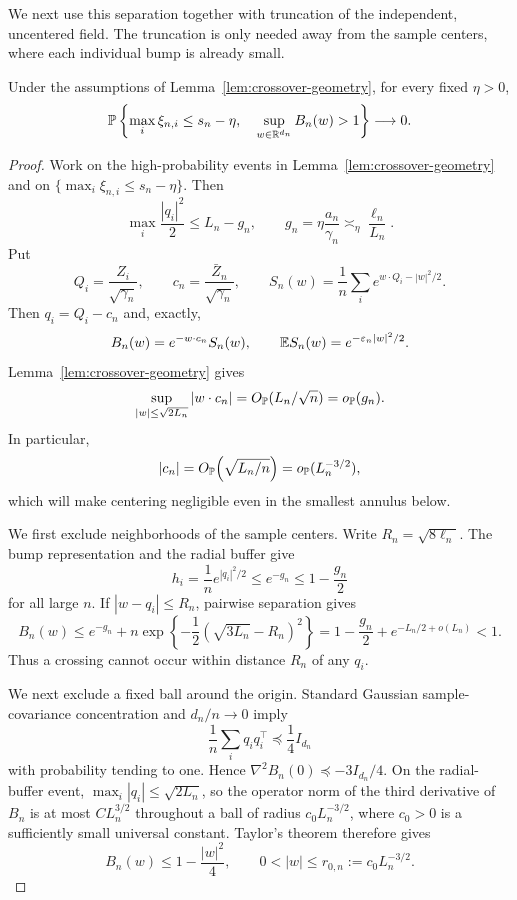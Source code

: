 We next use this separation together with truncation of the independent,
uncentered field.  The truncation is only needed away from the sample
centers, where each individual bump is already small.

\begin{proposition}
\label{prop:crossover-exclusion}
Under the assumptions of Lemma~\ref{lem:crossover-geometry}, for
every fixed \(\eta>0\),
\[
 \mathbb P\left\{
  \max_i\xi_{n,i}\le s_n-\eta,\quad
  \sup_{w\in\mathbb R^{d_n}}B_n(w)>1
 \right\}\longrightarrow0.
\]
\end{proposition}

\begin{proof}
Work on the high-probability events in Lemma~\ref{lem:crossover-geometry}
and on
\(\{\max_i\xi_{n,i}\le s_n-\eta\}\).  Then
\[
 \max_i\frac{|q_i|^2}{2}\le L_n-g_n,
 \qquad
 g_n=\eta\frac{a_n}{\gamma_n}\asymp_\eta\frac{\ell_n}{L_n}.
\]
 Put
 \[
  Q_i=\frac{Z_i}{\sqrt{\gamma_n}},
  \qquad c_n=\frac{\bar Z_n}{\sqrt{\gamma_n}},
  \qquad
  S_n(w)=\frac1n\sum_i e^{w\cdot Q_i-|w|^2/2}.
 \]
 Then \(q_i=Q_i-c_n\) and, exactly,
 \begin{equation}
 \label{eq:crossover-centering-identity}
  B_n(w)=e^{-w\cdot c_n}S_n(w),
  \qquad
  \mathbb E S_n(w)=e^{-\varepsilon_n|w|^2/2}.
 \end{equation}
 Lemma~\ref{lem:crossover-geometry} gives
 \begin{equation}
 \label{eq:crossover-centering-small}
  \sup_{|w|\le\sqrt{2L_n}}|w\cdot c_n|
 =O_{\mathbb P}(L_n/\sqrt n)=o_{\mathbb P}(g_n).
\end{equation}
In particular,
\[
 |c_n|=O_{\mathbb P}\!\left(\sqrt{L_n/n}\right)
 =o_{\mathbb P}(L_n^{-3/2}),
\]
which will make centering negligible even in the smallest annulus below.

 We first exclude neighborhoods of the sample centers.  Write
 \(R_n=\sqrt{8\ell_n}\).  The bump representation and the radial buffer
 give
 \[
  h_i=\frac1n e^{|q_i|^2/2}\le e^{-g_n}\le1-\frac{g_n}{2}
 \]
 for all large \(n\).  If \(|w-q_i|\le R_n\), pairwise separation gives
 \[
  B_n(w)
  \le e^{-g_n}
  +n\exp\left\{-\frac12(\sqrt{3L_n}-R_n)^2\right\}
  =1-\frac{g_n}{2}+e^{-L_n/2+o(L_n)}<1.
 \]
 Thus a crossing cannot occur within distance \(R_n\) of any \(q_i\).

We next exclude a fixed ball around the origin.  Standard Gaussian
sample-covariance concentration and \(d_n/n\to0\) imply
\[
 \frac1n\sum_iq_iq_i^\top\preceq\frac14I_{d_n}
\]
with probability tending to one.  Hence
\(\nabla^2B_n(0)\preceq-3I_{d_n}/4\).  On the radial-buffer event,
\(\max_i|q_i|\le\sqrt{2L_n}\), so the operator norm of the third derivative
of \(B_n\) is at most \(CL_n^{3/2}\) throughout a ball of radius
\(c_0L_n^{-3/2}\), where \(c_0>0\) is a sufficiently small universal
constant.  Taylor's theorem therefore gives
\begin{equation}
\label{eq:crossover-microscopic}
 B_n(w)\le1-\frac{|w|^2}{4},
 \qquad 0<|w|\le r_{0,n}:=c_0L_n^{-3/2}.
\end{equation}


\end{proof}
